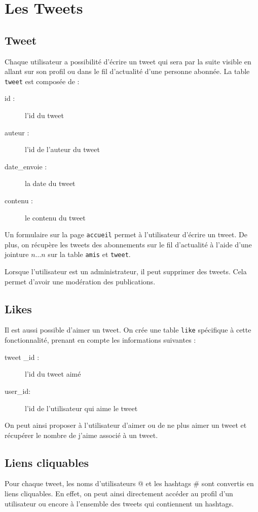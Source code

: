 \documentclass[a4paper, 12pt]{article}
\begin{document}
\section{Les Tweets}	

\subsection{Tweet}
Chaque utilisateur a possibilité d'écrire un tweet qui sera par la suite visible en allant sur son profil ou dans le fil d'actualité d'une personne abonnée. La table \texttt{tweet} est composée de :
\begin{description}
\item[id :] l'id du tweet
\item[auteur :] l’id de l’auteur du tweet
\item[date\_envoie :] la date du tweet
\item[contenu :] le contenu du tweet
\end{description}
Un formulaire sur la page \texttt{accueil} permet à l’utilisateur d’écrire un tweet.
De plus, on récupère les tweets des abonnements sur le fil d’actualité à l’aide d'une  jointure $n…n$ sur la table \texttt{amis} et \texttt{tweet}.

Lorsque l'utilisateur est un administrateur, il peut supprimer des tweets. Cela permet d'avoir une modération des publications.

\subsection{Likes}
Il est aussi possible d'aimer un tweet. On crée une table \texttt{like} spécifique à cette fonctionnalité, prenant en compte les informations suivantes :
\begin{description}
\item[tweet \_id :] l’id du tweet aimé
\item[user\_id:] l'id de l'utilisateur qui aime le tweet
\end{description}
On peut ainsi proposer à l'utilisateur d'aimer ou de ne plus aimer un tweet et récupérer le nombre de j'aime associé à un tweet.

\subsection{Liens cliquables}		
Pour chaque tweet, les noms d'utilisateurs @ et les hashtags \# sont convertis en liens cliquables. En effet, on peut ainsi directement accéder au profil d'un utilisateur ou encore à l'ensemble des tweets qui contiennent un hashtags. 
\end{document}
